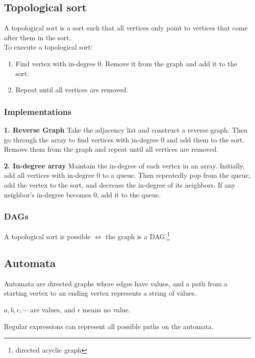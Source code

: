 \subsection{Topological sort}
A topological sort is a sort such that all vertices only point to vertices that come after them in the sort. \\

To execute a topological sort:
\begin{enumerate}
    \setlength{\itemsep}{0em}
    \item Find vertex with in-degree 0. Remove it from the graph and add it to the sort.
    \item Repeat until all vertices are removed.
\end{enumerate}

\subsubsection{Implementations}

\textbf{1. Reverse Graph}
Take the adjacency list and construct a reverse graph. Then go through the array to find vertices with in-degree 0 and add them to the sort. Remove them from the graph and repeat until all vertices are removed.


\textbf{2. In-degree array}
Maintain the in-degree of each vertex in an array. Initially, add all vertices with in-degree 0 to a queue. Then repeatedly pop from the queue, add the vertex to the sort, and decrease the in-degree of its neighbors. If any neighbor's in-degree becomes 0, add it to the queue.


\subsubsection{DAGs}
A topological sort is possible $\iff$ the graph is a DAG.\footnote{directed acyclic graph}

\subsection{Automata}
Automata are directed graphs where edges have values, and a path from a starting vertex to an ending vertex represents a string of values.

$a,b,c, \cdots$ are values, and $\epsilon$ means no value.

Regular expressions can represent all possible paths on the automata.

